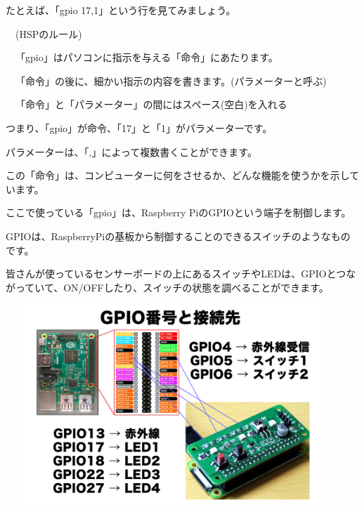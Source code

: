 \documentclass[a4paper,dvipdfmx]{jarticle}
\begin{document}
\bigskip


\bigskip


\bigskip


\bigskip


\bigskip


\bigskip

たとえば、「gpio
17,1」という行を見てみましょう。


\bigskip

\ \ (HSPのルール)


\bigskip

\ \ 「gpio」はパソコンに指示を与える「命令」にあたります。

\ \ 「命令」の後に、細かい指示の内容を書きます。(パラメーターと呼ぶ)

\ \ 「命令」と「パラメーター」の間にはスペース(空白)を入れる


\bigskip

つまり、「gpio」が命令、「17」と「1」がパラメーターです。

パラメーターは、「,」によって複数書くことができます。

この「命令」は、コンピューターに何をさせるか、どんな機能を使うかを示しています。

ここで使っている「gpio」は、Raspberry
PiのGPIOという端子を制御します。


\bigskip

GPIOは、RaspberryPiの基板から制御することのできるスイッチのようなものです。

皆さんが使っているセンサーボードの上にあるスイッチやLEDは、GPIOとつながっていて、ON/OFFしたり、スイッチの状態を調べることができます。


\bigskip



\begin{center}
\includegraphics[width=12.409cm,height=7.62cm]{text02-img/text02-img025.png}

\end{center}
\end{document}
